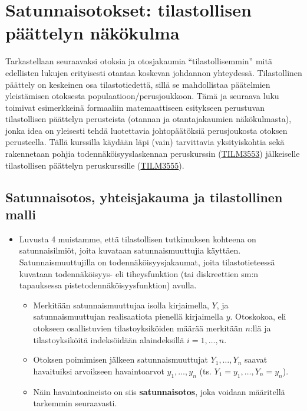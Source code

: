 \documentclass[
]{book}
\providecommand{\tightlist}{%
  \setlength{\itemsep}{0pt}\setlength{\parskip}{0pt}}
\begin{document}

\hypertarget{luku8}{%
\chapter{Satunnaisotokset: tilastollisen päättelyn näkökulma}\label{luku8}}

Tarkastellaan seuraavaksi otoksia ja otosjakaumia ``tilastollisemmin'' mitä edellisten lukujen erityisesti otantaa koskevan johdannon yhteydessä. Tilastollinen päättely on keskeinen osa tilastotiedettä, sillä se mahdollistaa päätelmien yleistämisen otoksesta populaatioon/perusjoukkoon. Tämä ja seuraava luku toimivat esimerkkeinä formaaliin matemaattiseen esitykseen perustuvan tilastollisen päättelyn perusteista (otannan ja otantajakaumien näkökulmasta), jonka idea on yleisesti tehdä luotettavia johtopäätöksiä perusjoukosta otoksen perusteella. Tällä kurssilla käydään läpi (vain) tarvittavia yksityiskohtia sekä rakennetaan pohjia todennäköisyyslaskennan peruskurssin (\href{https://opas.peppi.utu.fi/fi/opintojakso/TILM3553/1734?period=2024-2027}{TILM3553}) jälkeiselle tilastollisen päättelyn peruskurssille (\href{https://opas.peppi.utu.fi/fi/opintojakso/TILM3555/1731?period=2024-2027}{TILM3555}).

\hypertarget{alaluku81}{%
\section{Satunnaisotos, yhteisjakauma ja tilastollinen malli}\label{alaluku81}}

\begin{itemize}
\tightlist
\item
  Luvusta 4 muistamme, että tilastollisen tutkimuksen kohteena on satunnaisilmiöt, joita kuvataan satunnaismuuttujia käyttäen. Satunnaismuuttujilla on todennäköisyysjakaumat, joita tilastotieteessä kuvataan todennäköisyys- eli tiheysfunktion (tai diskreettien sm:n tapauksessa pistetodennäköisyysfunktion) avulla.

  \begin{itemize}
  \tightlist
  \item
    Merkitään satunnaismuuttujaa isolla kirjaimella, \(Y\), ja satunnaismuuttujan realisaatiota pienellä kirjaimella \(y\). Otoskokoa, eli otokseen osallistuvien tilastoyksiköiden määrää merkitään \(n\):llä ja tilastoyksiköitä indeksöidään alaindeksillä \(i=1,\ldots,n\).
  \item
    Otoksen poimimisen jälkeen satunnaismuuttujat \(Y_1, \ldots, Y_n\) saavat havaituiksi arvoikseen havaintoarvot \(y_1, \ldots, y_n\) (ts. \(Y_1=y_1, \ldots, Y_n = y_n\)).
  \item
    Näin havaintoaineisto on siis \textbf{satunnaisotos}, joka voidaan määritellä tarkemmin seuraavasti.
  \end{itemize}
\end{itemize}
\end{document}
